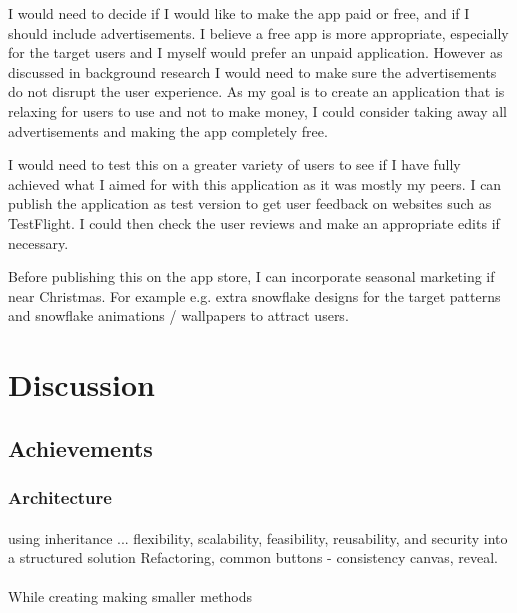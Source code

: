 \documentclass[11pt]{article}
\begin{document}
        I would need to decide if I would like to make the app paid or free, and if I should include advertisements. I believe a free app is more appropriate, especially for the target users and I myself would prefer an unpaid application. However as discussed in background research I would need to make sure the advertisements do not disrupt the user experience. As my goal is to create an application that is relaxing for users to use and not to make money, I could consider taking away all advertisements and making the app completely free.
        
        I would need to test this on a greater variety of users to see if I have fully achieved what I aimed for with this application as it was mostly my peers.  I can publish the application as test version to get user feedback on websites such as TestFlight. %
        I could then check the user reviews and make an appropriate edits if necessary. 
        
        Before publishing this on the app store, I can incorporate seasonal marketing if near Christmas. For example e.g. extra snowflake designs for the target patterns and snowflake animations / wallpapers to attract users.
        
        
\newpage
\section{Discussion}
    \subsection{Achievements}
        \subsubsection{Architecture}
        
        \paragraph{}
        using inheritance ... 
         flexibility, scalability, feasibility, reusability, and security into a structured solution
         Refactoring, 
         common buttons - consistency
         canvas, reveal. 
        
        \paragraph{}
        While creating making smaller methods
        
\end{document}

